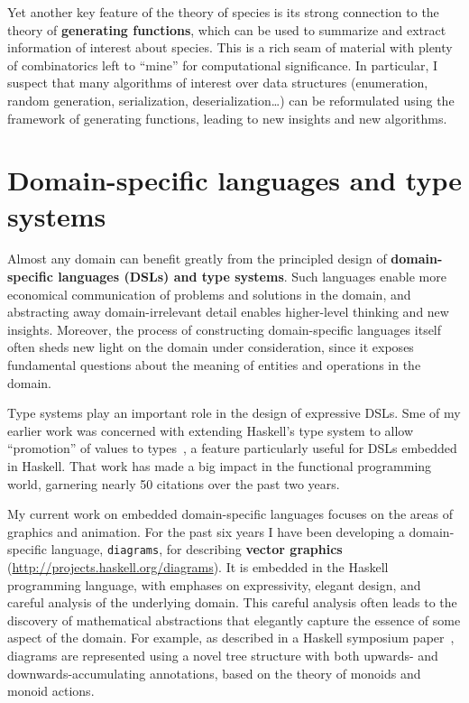 \documentclass[12pt]{article}
\begin{document}
Yet another key feature of the theory of species is its strong
connection to the theory of \textbf{generating functions}, which can
be used to summarize and extract information of interest about
species.  This is a rich seam of material with plenty of combinatorics
left to ``mine'' for computational significance.  In particular, I
suspect that many algorithms of interest over data structures
(enumeration, random generation, serialization, deserialization\dots)
can be reformulated using the framework of generating functions,
leading to new insights and new algorithms.

\section*{Domain-specific languages and type systems}
\label{sec:edsls}

Almost any domain can benefit greatly from the principled design of
\textbf{domain-specific languages (DSLs) and type systems}.  Such
languages enable more economical communication of problems and
solutions in the domain, and abstracting away domain-irrelevant detail
enables higher-level thinking and new insights.  Moreover, the process
of constructing domain-specific languages itself often sheds new light
on the domain under consideration, since it exposes fundamental
questions about the meaning of entities and operations in the domain.

Type systems play an important role in the design of expressive DSLs.
Sme of my earlier work was concerned with extending Haskell's type
system to allow ``promotion'' of values to
types~\cite{Yorgey2012promotion}, a feature particularly useful for
DSLs embedded in Haskell.  That work has made a big impact in the
functional programming world, garnering nearly 50 citations over the
past two years.

My current work on embedded domain-specific languages focuses on the
areas of graphics and animation.  For the past six years I have been
developing a domain-specific language, \texttt{diagrams}, for
describing \textbf{vector graphics}
(\url{http://projects.haskell.org/diagrams}). It is embedded in the
Haskell programming language, with emphases on expressivity, elegant
design, and careful analysis of the underlying domain. This careful
analysis often leads to the discovery of mathematical abstractions
that elegantly capture the essence of some aspect of the domain.  For
example, as described in a Haskell symposium
paper~\cite{Yorgey2012monoids}, diagrams are represented using a novel
tree structure with both upwards- and downwards-accumulating
annotations, based on the theory of monoids and monoid actions.
\end{document}
